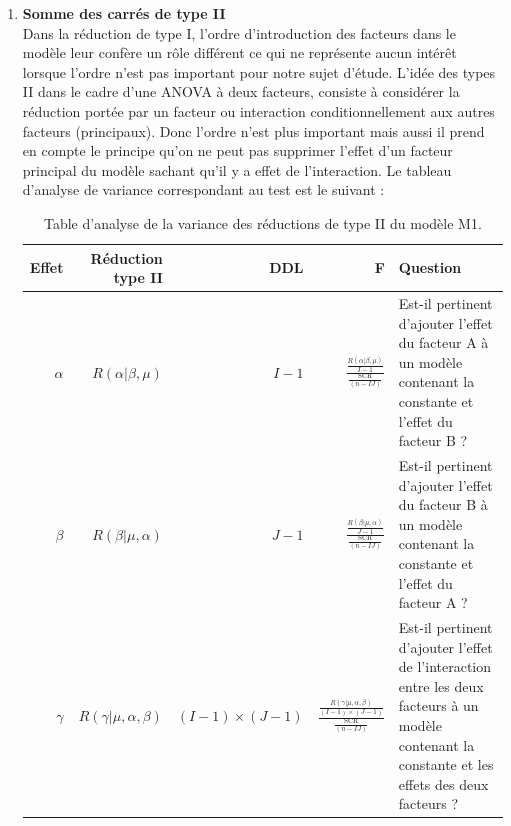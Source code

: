 \documentclass[12pt,a4paper]{article}
\begin{document}
\begin{enumerate}[label=\alph*)]
		\item \textbf{Somme des carrés de type II}\\
		Dans la réduction de type I, l'ordre d'introduction des facteurs dans le modèle leur confère un rôle différent ce qui ne représente aucun intérêt lorsque l'ordre n'est pas important pour notre sujet d'étude. L'idée des types II dans le cadre d'une ANOVA à deux facteurs, consiste à considérer la réduction portée par un facteur ou interaction conditionnellement aux autres facteurs (principaux). Donc l'ordre n'est plus important mais aussi il prend en compte le principe qu'on ne peut pas supprimer l'effet d'un facteur principal du modèle sachant qu'il y a effet de l'interaction.
		Le tableau d'analyse de variance correspondant au test est le suivant : 
		\begin{table}[H]
			\centering
			\begin{tabular}{rrrrp{8cm}}
				\toprule
				\textbf{Effet} & \textbf{Réduction type II} & \textbf{DDL} & \textbf{F} & \textbf{Question} \\
				\midrule
				$\alpha$ & $R(\alpha|\beta, \mu)$ & $I-1$ & \LARGE{$\frac{\frac{R(\alpha|\beta, \mu)}{I-1}}{\frac{\text{SCR}}{(n - IJ)}}$} & Est-il pertinent d'ajouter l'effet du facteur A à un modèle contenant la constante et l'effet du facteur B ? \\
				$\beta$ & $R(\beta|\mu, \alpha)$ & $J-1$ & \LARGE{$\frac{\frac{R(\beta|\mu, \alpha)}{J-1}}{\frac{\text{SCR}}{(n - IJ)}}$} & Est-il pertinent d'ajouter l'effet du facteur B à un modèle contenant la constante et l'effet du facteur A ? \\
				$\gamma$ & $R(\gamma|\mu, \alpha, \beta)$ & $(I-1) \times (J-1)$ & \LARGE{$\frac{\frac{R(\gamma|\mu, \alpha, \beta)}{(I-1) \times (J-1)}}{\frac{\text{SCR}}{(n - IJ)}}$} & Est-il pertinent d'ajouter l'effet de l'interaction entre les deux facteurs à un modèle contenant la constante et les effets des deux facteurs ? \\
				\bottomrule
			\end{tabular}
			\caption{Table d'analyse de la variance des réductions de type II du modèle M1.}
		\end{table}
		

\end{enumerate}
\end{document}
